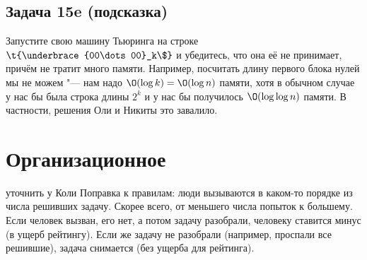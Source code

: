 \subsection{Задача 15e (подсказка)}
	Запустите свою машину Тьюринга на строке $\t{\underbrace{00\dots00}_k\$}$ и убедитесь, что она её не принимает,
	причём не тратит много памяти.
	Например, посчитать длину первого блока нулей мы не можем "--- нам надо $\O(\log k)=\O(\log n)$ памяти,
	хотя в обычном случае у нас бы была строка длины $2^k$ и у нас бы получилось $\O(\log \log n)$ памяти.
	В частности, решения Оли и Никиты это завалило.

\section{Организационное}
	\TODO уточнить у Коли
	Поправка к правилам: люди вызываются в каком-то порядке из числа решивших задачу.
	Скорее всего, от меньшего числа попыток к большему.
	Если человек вызван, его нет, а потом задачу разобрали, человеку ставится минус (в ущерб рейтингу).
	Если же задачу не разобрали (например, проспали все решившие), задача снимается (без ущерба для рейтинга).
